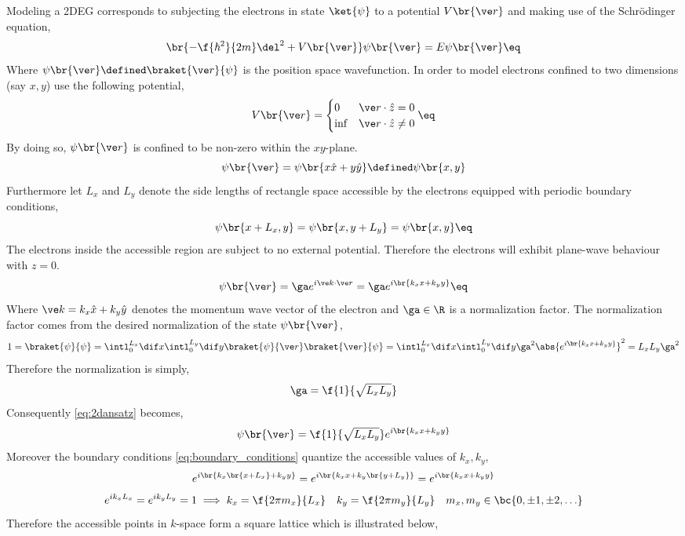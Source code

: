 \documentclass{article}
\begin{document}
Modeling a 2DEG corresponds to subjecting the electrons in state $\ket{\psi}$ to a potential $V\br{\ve r}$ and making use of the Schrödinger equation,
\[ \br{-\f{\hbar^2}{2m} \del^2 + V\br{\ve r}}\psi\br{\ve r} = E \psi\br{\ve r} \eq \label{eq:tise} \]
Where $\psi\br{\ve r} \defined \braket{\ve r}{\psi}$ is the position space wavefunction. In order to model electrons confined to two dimensions (say $x,y$) use the following potential,
\[ V\br{\ve r} = \begin{cases}
    0 & \ve r \cdot \hat z = 0 \\
    \inf & \ve r \cdot \hat z \neq 0
\end{cases} \eq \label{eq:potential}\]
By doing so, $\psi\br{\ve r}$ is confined to be non-zero within the $xy$-plane.
\[ \psi\br{\ve r} = \psi\br{x \hat x + y \hat y } \defined \psi\br{x,y} \]
Furthermore let $L_x$ and $L_y$ denote the side lengths of rectangle space accessible by the electrons equipped with periodic boundary conditions,
\[ \psi\br{x + L_x, y} = \psi\br{x, y+ L_y} = \psi\br{x,y} \eq \label{eq:boundary_conditions} \]
The electrons inside the accessible region are subject to no external potential. Therefore the electrons will exhibit plane-wave behaviour with $z = 0$.
\[ \psi\br{\ve r} = \ga e^{i \ve k \cdot \ve r} = \ga e^{i \br{k_x x + k_y y}} \eq \label{eq:2dansatz} \]
Where $\ve k = k_x \hat x + k_y \hat y$ denotes the momentum wave vector of the electron and $\ga \in \R$ is a normalization factor. The normalization factor comes from the desired normalization of the state $\psi\br{\ve r}$,
\[ 1 = \braket{\psi}{\psi} = \intl_{0}^{L_x} \dif x \intl_{0}^{L_y} \dif y \braket{\psi}{\ve r}\braket{\ve r}{\psi} = \intl_{0}^{L_x} \dif x \intl_{0}^{L_y} \dif y \ga^2 \abs{e^{i \br{k_x x + k_y y}}}^2 = L_x L_y \ga^2 \]
Therefore the normalization is simply,
\[ \ga = \f{1}{\sqrt{L_x L_y}} \]
Consequently \cref{eq:2dansatz} becomes,
\[ \psi\br{\ve r} = \f{1}{\sqrt{L_x L_y}} e^{i \br{k_x x + k_y y}} \]
Moreover the boundary conditions \cref{eq:boundary_conditions} quantize the accessible values of $k_x, k_y$,
\[ e^{i \br{k_x\br{x + L_x} + k_y y}} = e^{i \br{k_x x + k_y \br{y + L_y}}} = e^{i \br{k_x x + k_y y}} \]
\[ e^{i k_x L_x} = e^{i k_y L_y} = 1 \implies k_x = \f{2 \pi m_x}{L_x} \quad k_y = \f{2 \pi m_y}{L_y} \quad m_x, m_y \in \bc{0, \pm 1, \pm 2,\ldots} \]
Therefore the accessible points in $k$-space form a square lattice which is illustrated below,
\end{document}
